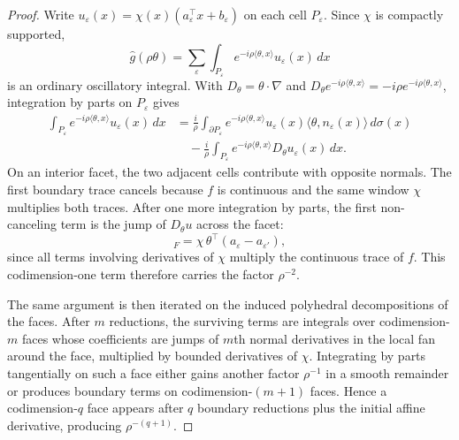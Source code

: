 \documentclass[10pt,twocolumn]{article}
\newcommand{\1}{\mathbf{1}}
\newcommand{\wh}{\widehat}
\begin{document}
\begin{proof}
Write $u_\varepsilon(x)=\chi(x)(a_\varepsilon^\top x+b_\varepsilon)$ on each cell $P_\varepsilon$.  Since $\chi$ is compactly supported,
\begin{equation}
\wh g(\rho\theta)=
\sum_\varepsilon
\int_{P_\varepsilon}e^{-i\rho\langle\theta,x\rangle}
u_\varepsilon(x)\,dx
\end{equation}
is an ordinary oscillatory integral.  With $D_\theta=\theta\cdot\nabla$ and
$D_\theta e^{-i\rho\langle\theta,x\rangle}=-i\rho e^{-i\rho\langle\theta,x\rangle}$, integration by parts on $P_\varepsilon$ gives
\begin{align}
\int_{P_\varepsilon}e^{-i\rho\langle\theta,x\rangle}u_\varepsilon(x)\,dx
&=\frac{i}{\rho}
\int_{\partial P_\varepsilon}
e^{-i\rho\langle\theta,x\rangle}
u_\varepsilon(x)\langle\theta,n_\varepsilon(x)\rangle\,d\sigma(x) \nonumber\\
&\quad-\frac{i}{\rho}
\int_{P_\varepsilon}
e^{-i\rho\langle\theta,x\rangle}D_\theta u_\varepsilon(x)\,dx.
\end{align}
On an interior facet, the two adjacent cells contribute with opposite normals.  The first boundary trace cancels because $f$ is continuous and the same window $\chi$ multiplies both traces.  After one more integration by parts, the first non-canceling term is the jump of $D_\theta u$ across the facet:
\begin{equation}
[D_\theta u]_F
=\chi\,\theta^\top(a_\varepsilon-a_{\varepsilon'}),
\end{equation}
since all terms involving derivatives of $\chi$ multiply the continuous trace of $f$.  This codimension-one term therefore carries the factor $\rho^{-2}$.

The same argument is then iterated on the induced polyhedral decompositions of the faces.  After $m$ reductions, the surviving terms are integrals over codimension-$m$ faces whose coefficients are jumps of $m$th normal derivatives in the local fan around the face, multiplied by bounded derivatives of $\chi$.  Integrating by parts tangentially on such a face either gains another factor $\rho^{-1}$ in a smooth remainder or produces boundary terms on codimension-$(m+1)$ faces.  Hence a codimension-$q$ face appears after $q$ boundary reductions plus the initial affine derivative, producing $\rho^{-(q+1)}$.


\end{proof}
\end{document}
